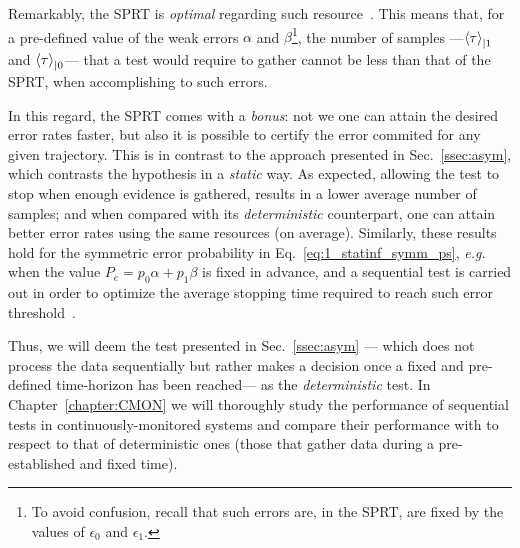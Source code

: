 Remarkably, the SPRT is \textit{optimal} regarding such resource~\cite{Wald1948Optimum}. This means that, for a pre-defined value of the weak errors $\alpha$ and $\beta$\footnote{To avoid confusion, recall that such errors are, in the SPRT, are fixed by the values of $\epsilon_0$ and $\epsilon_1$.}, the number of samples ---$\mathinner{\langle \tau\rangle}_{|1}$ and $\mathinner{\langle \tau\rangle}_{|0}$--- that a test would require to gather cannot be less than that of the SPRT, when accomplishing to such errors.

In this regard, the SPRT comes with a \textit{bonus}: not we one can attain the desired error rates faster, but also it is possible to certify the error commited for any given trajectory. This is in contrast to the approach presented in Sec.~\ref{ssec:asym}, which contrasts the hypothesis in a \textit{static} way. As expected, allowing the test to stop when enough evidence is gathered, results in a lower average number of samples; and when compared with its \textit{deterministic} counterpart, one can attain better error rates using the same resources (on average). Similarly, these results hold for the symmetric error probability in Eq.~\ref{eq:1_statinf_symm_ps}, \textit{e.g.} when the value $P_e = p_0 \alpha + p_1 \beta$ is fixed in advance, and a sequential test is carried out in order to optimize the average stopping time required to reach such error threshold~\cite{Gordon1976Improved}.

Thus, we will deem the test presented in Sec.~\ref{ssec:asym} --- which does not process the data sequentially but rather makes a decision once a fixed and pre-defined time-horizon has been reached--- as the \textit{deterministic} test. In Chapter~\ref{chapter:CMON} we will thoroughly study the performance of sequential tests in continuously-monitored systems and compare their performance with to respect to that of deterministic ones (those that gather data during a pre-established and fixed time).
